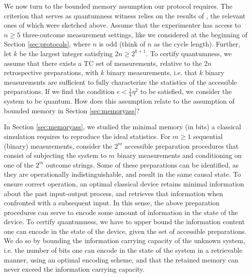We now turn to the bounded memory assumption our protocol requires. The criterion that serves as quantumness witness relies on the results of \cite{Pusey2019a}, the relevant ones of which were sketched above. Assume that the experimenter has access to $n\geq 5$ three-outcome measurement settings, like we considered at the beginning of Section \ref{sec:protocols}, where $n$ is odd (think of $n$ as the cycle length). Further, let $k$ be the largest integer satisfying $2n\geq 2^{k+1}$. To certify quantumness, we assume that there exists a TC set of measurements, relative to the $2n$ retrospective preparations, with $k$ binary measurements, i.e. that $k$ binary measurements are sufficient to fully characterize the statistics of the accessible preparations. If we find the condition $\epsilon<\frac{1}{4}\eta^2$ to be satisfied, we consider the system to be quantum.  How does this assumption relate to the assumption of bounded memory in Section \ref{sec:memoryass}? 

In Section \ref{sec:memoryass}, we studied the minimal memory (in bits) a classical simulation requires to reproduce the ideal statistics. 
For $m\geq1$ sequential (binary) measurements, consider the $2^m$ accessible preparation procedures that consist of subjecting the system to $m$ binary measurements and conditioning on one of the $2^m$ outcome strings. Some of these preparations can be identified, as they are operationally indistinguishable, and result in the same causal state. To ensure correct operation, an optimal classical device retains minimal information about the past input-output process, and retrieves that information when confronted with a subsequent input. In this sense, the above preparation procedures can serve to encode some amount of information in the state of the device. To certify quantumness, we have to upper bound the information content one can encode in the state of the device, given the set of accessible preparations. We do so by bounding the information carrying capacity of the unknown system, i.e. the number of bits one can encode in the state of the system in a retrievable manner, using an optimal encoding scheme, and that the retained memory can never exceed the information carrying capacity. 

